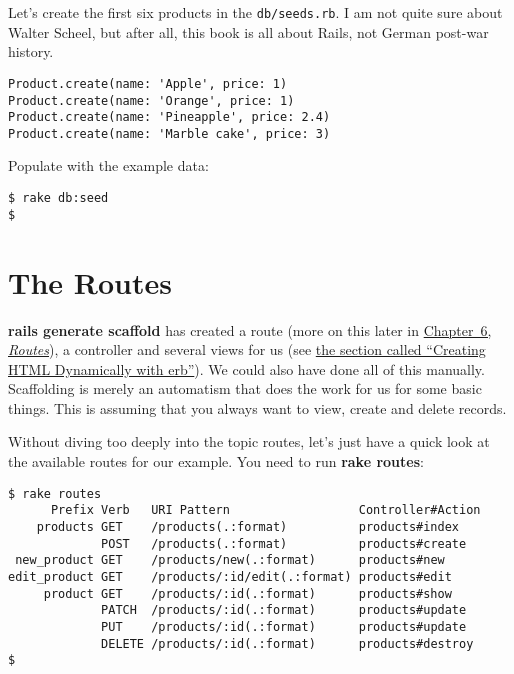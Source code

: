 \documentclass[a4paper]{book}
\begin{document}
Let's create the first six products in the \texttt{db/seeds.rb}. I am not quite sure about Walter Scheel, but after all, this book is all about Rails, not German post-war history.

\begin{shaded}\begin{verbatim}
Product.create(name: 'Apple', price: 1)
Product.create(name: 'Orange', price: 1)
Product.create(name: 'Pineapple', price: 2.4)
Product.create(name: 'Marble cake', price: 3)
\end{verbatim}\end{shaded}

Populate with the example data:

\begin{shaded}\begin{verbatim}
$ rake db:seed
$
\end{verbatim}\end{shaded}

\section{The Routes}\label{the-routes}

\textbf{rails generate scaffold} has created a route (more on this later in \hyperref[routes]{Chapter~6, \emph{Routes}}), a controller and several views for us (see \hyperref[dynamischeux5fwebseiten]{the section called “Creating HTML Dynamically with erb”}). We could also have done all of this manually. Scaffolding is merely an automatism that does the work for us for some basic things. This is assuming that you always want to view, create and delete records.

Without diving too deeply into the topic routes, let's just have a quick look at the available routes for our example. You need to run \textbf{rake routes}:

\begin{shaded}\begin{verbatim}
$ rake routes
      Prefix Verb   URI Pattern                  Controller#Action
    products GET    /products(.:format)          products#index
             POST   /products(.:format)          products#create
 new_product GET    /products/new(.:format)      products#new
edit_product GET    /products/:id/edit(.:format) products#edit
     product GET    /products/:id(.:format)      products#show
             PATCH  /products/:id(.:format)      products#update
             PUT    /products/:id(.:format)      products#update
             DELETE /products/:id(.:format)      products#destroy
$
\end{verbatim}\end{shaded}
\end{document}
